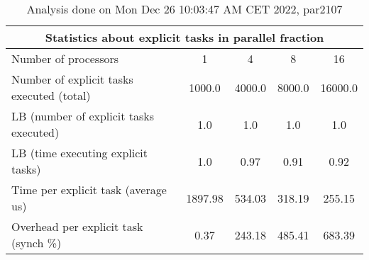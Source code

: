 \begin{table}[h]
\begin{center}
\begin{tabular}{|l|c|c|c|c|}
\hline
\multicolumn{5}{|c|}{Statistics about explicit tasks in parallel fraction} \\
\hline
\hline
Number of processors & 1 & 4 & 8 & 16 \\
\hline
\hline
Number of explicit tasks executed (total)        &          1000.0 &          4000.0 &          8000.0 &         16000.0 \\
\hline
LB (number of explicit tasks executed)           &             1.0 &             1.0 &             1.0 &             1.0 \\
\hline
LB (time executing explicit tasks)               &             1.0 &            0.97 &            0.91 &            0.92 \\
\hline
Time per explicit task (average us)                 &         1897.98 &          534.03 &          318.19 &          255.15 \\
\hline
Overhead per explicit task (synch \%)             &            0.37 &          243.18 &          485.41 &          683.39 \\
\hline
\end{tabular}
\end{center}
\caption{ Analysis done on Mon Dec 26 10:03:47 AM CET 2022, par2107}
\end{table}
